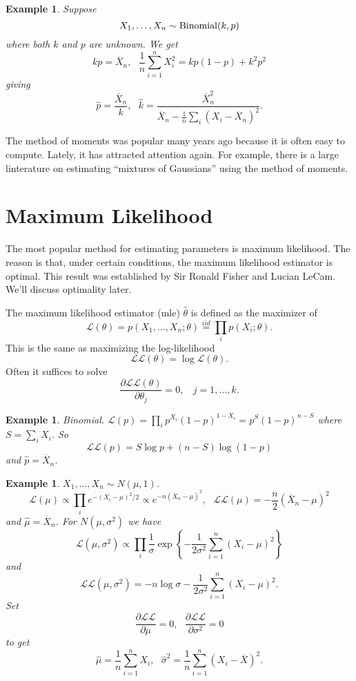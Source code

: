 \documentclass[twoside,12pt]{article}
\newtheorem{example}[theorem]{Example}
\begin{document}
\vspace{1cm}

\begin{example}
Suppose
$$
X_1, \ldots, X_n \sim {\rm Binomial}(k,p)
$$
where both $k$ and $p$ are unknown.
We get
$$
kp = \overline{X}_n,\ \ \ 
\frac{1}{n}\sum_{i=1}^n X_i^2 = kp (1-p) + k^2 p^2
$$
giving
$$
\widehat{p} = \frac{\overline{X}_n}{k},\ \ \ 
\widehat{k} = \frac{\overline{X}_n^2}{\overline{X}_n- \frac{1}{n}\sum_i (X_i-\overline{X}_n)^2}.
$$
\end{example}


The method of moments was popular many years ago
because it is often easy to compute.
Lately, it has attracted attention again.
For example, there is a large linterature on estimating
``mixtures of Gaussians'' using the method of moments.


\section{Maximum Likelihood}

The most popular method for estimating parameters
is {\rm maximum likelihood.}
The reason is that, under certain conditions,
the maximum likelihood estimator is optimal.
This result was established by Sir Ronald Fisher and Lucian LeCam.
We'll discuss optimality later.

The maximum likelihood estimator (mle)
$\widehat\theta$ is defined as the maximizer of
$$
\mathcal{L}(\theta) = p(X_1,\ldots, X_n;\theta) \stackrel{iid}{=} \prod_i p(X_i;\theta).
$$
This is the same as maximizing the log-likelihood
$$
\mathcal{LL}(\theta) = \log \mathcal{L}(\theta).
$$
Often it suffices to solve
$$
\frac{\partial \mathcal{LL} (\theta)}{\partial \theta_j} = 0,\ \ \ \ j=1,\ldots, k.
$$

\vspace{1cm}


\begin{example}
Binomial.
$ \mathcal{L}(p) = \prod_i p^{X_i} (1-p)^{1-X_i} = p^S (1-p)^{n-S}$
where $S = \sum_i X_i$. So
$$
 \mathcal{LL}(p) = S \log p + (n-S)\log(1-p)
$$
and $\widehat{p}= \overline{X}_n$.
\end{example}

\begin{example}
$X_1,\ldots, X_n \sim N(\mu,1)$.
$$
 \mathcal{L}(\mu)\propto \prod_i e^{-(X_i-\mu)^2/2} \propto e^{-n(\overline{X}_n-\mu)^2},\ \ \ 
 \mathcal{LL}(\mu) =- \frac{n}{2} (\overline{X}_n-\mu)^2
$$
and
$\widehat\mu = \overline{X}_n$.
For $N(\mu,\sigma^2)$ we have
$$
 \mathcal{L}(\mu,\sigma^2) \propto \prod_i \frac{1}{\sigma} \exp\left\{ - \frac{1}{2\sigma^2} \sum_{i=1}^n (X_i-\mu)^2 \right\}
$$
and
$$
 \mathcal{LL}(\mu,\sigma^2) = -n \log \sigma  - \frac{1}{2\sigma^2} \sum_{i=1}^n (X_i-\mu)^2 .
$$
Set
$$
\frac{\partial  \mathcal{LL}}{\partial \mu} =0,\ \ \ 
\frac{\partial  \mathcal{LL}}{\partial \sigma^2} =0
$$
to get
$$
\widehat\mu = \frac{1}{n}\sum_{i=1}^n X_i,\ \ \ 
\widehat\sigma^2 = \frac{1}{n}\sum_{i=1}^n (X_i-\overline{X})^2.
$$
\end{example}
\end{document}
